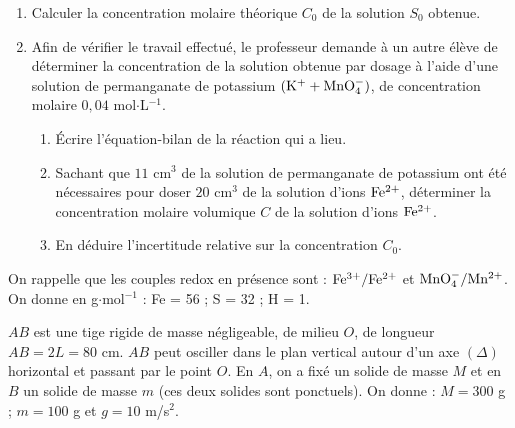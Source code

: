 \documentclass[11pt]{article}
\begin{document}
\begin{enumerate}
  \item Calculer la concentration molaire théorique $C_0$ de la solution $S_0$ obtenue.
  \item Afin de vérifier le travail effectué, le professeur demande à un autre élève de déterminer la concentration de la solution obtenue par dosage à l'aide d'une solution de permanganate de potassium $(\mathrm{K^+} + \mathrm{MnO_4^-})$, de concentration molaire $0{,}04$ mol$\cdot$L$^{-1}$.
  \begin{enumerate}[label=\alph*.]
    \item Écrire l'équation-bilan de la réaction qui a lieu.
    \item Sachant que $11$ cm$^3$ de la solution de permanganate de potassium ont été nécessaires pour doser $20$ cm$^3$ de la solution d'ions $\mathrm{Fe^{2+}}$, déterminer la concentration molaire volumique $C$ de la solution d'ions $\mathrm{Fe^{2+}}$.
    \item En déduire l'incertitude relative sur la concentration $C_0$.
  \end{enumerate}
\end{enumerate}
\noindent On rappelle que les couples redox en présence sont : $\mathrm{Fe^{3+}/Fe^{2+}}$ et $\mathrm{MnO_4^-/Mn^{2+}}$. On donne en g$\cdot$mol$^{-1}$ : Fe = 56 ; S = 32 ; H = 1.


$AB$ est une tige rigide de masse négligeable, de milieu $O$, de longueur $AB = 2L = 80$ cm. $AB$ peut osciller dans le plan vertical autour d'un axe $(\Delta)$ horizontal et passant par le point $O$. En $A$, on a fixé un solide de masse $M$ et en $B$ un solide de masse $m$ (ces deux solides sont ponctuels). On donne : $M = 300$ g ; $m = 100$ g et $g = 10$ m/s$^2$.

\begin{center}
\end{center}
\end{document}
